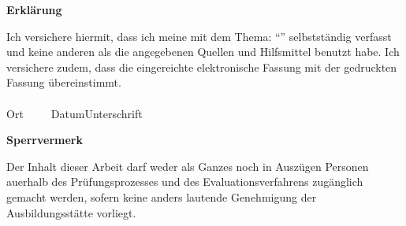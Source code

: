 

\newpage
\thispagestyle{empty}
\begin{framed}
    \begin{center}
        \Large\bfseries Erklärung
    \end{center}
    \medskip
    \noindent
    Ich versichere hiermit, dass ich meine \Was mit dem Thema:
    \enquote{\Titel}
    selbstständig verfasst und keine anderen als die angegebenen Quellen und Hilfsmittel benutzt habe. Ich versichere zudem, dass die eingereichte elektronische Fassung mit der gedruckten Fassung übereinstimmt.\\[3cm]
    \underline{\hspace{4cm}}\hfill\underline{\hspace{6cm}}\\
    Ort~~~~~Datum\hfill Unterschrift\hspace{4cm}
\end{framed}

\vfill
\begin{framed}
    \begin{center}
        \Large\bfseries Sperrvermerk
    \end{center}
    \medskip
    \noindent
    Der Inhalt dieser Arbeit darf weder als Ganzes noch in Auszügen Personen
    auerhalb des Prüfungsprozesses und des Evaluationsverfahrens zugänglich gemacht
    werden, sofern keine anders lautende Genehmigung der Ausbildungsstätte vorliegt.
\end{framed}

\endinput